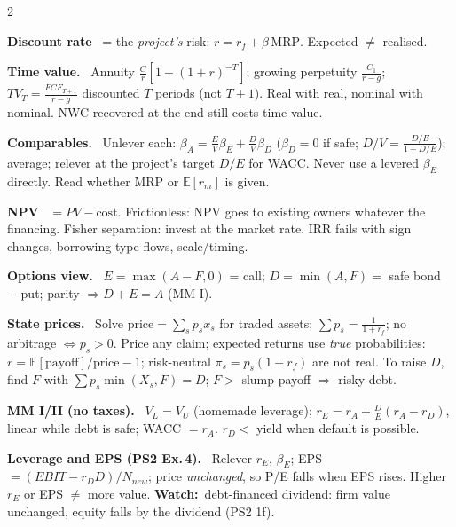 \documentclass[8pt,a4paper]{extarticle}
\newcommand{\sect}[1]{\par\needspace{4\baselineskip}\smallskip{\color{hd}\large\bfseries #1}\par\nopagebreak\vspace{1pt}}
\newcommand{\hd}[1]{\par\textbf{\color{hd}#1}~}
\newcommand{\watch}{\textbf{\color{wr}Watch:}~}
\newcommand{\E}{\mathbb{E}}
\begin{document}
\begin{multicols}{2}
\sect{2. Topic 2A --- Valuation, NPV, MM}
\hd{Discount rate} = the \emph{project's} risk: $r=r_f+\beta\,\text{MRP}$. Expected $\ne$ realised.
\hd{Time value.} Annuity $\frac Cr[1-(1+r)^{-T}]$; growing perpetuity $\frac{C_1}{r-g}$;
$TV_T=\frac{FCF_{T+1}}{r-g}$ discounted $T$ periods (not $T+1$). Real with real, nominal with nominal.
NWC recovered at the end still costs time value.
\hd{Comparables.} Unlever each: $\beta_A=\frac EV\beta_E+\frac DV\beta_D$ ($\beta_D=0$ if safe;
$D/V=\frac{D/E}{1+D/E}$); average; relever at the project's target $D/E$ for WACC. Never use a levered
$\beta_E$ directly. Read whether MRP or $\E[r_m]$ is given.
\hd{NPV} $=PV-\text{cost}$. Frictionless: NPV goes to existing owners whatever the financing. Fisher
separation: invest at the market rate. IRR fails with sign changes, borrowing-type flows, scale/timing.
\hd{Options view.} $E=\max(A-F,0)$ = call; $D=\min(A,F)=$ safe bond $-$ put; parity $\Rightarrow D+E=A$
(MM I).
\hd{State prices.} Solve $\text{price}=\sum_s p_sx_s$ for traded assets; $\sum p_s=\frac1{1+r_f}$; no
arbitrage $\Leftrightarrow p_s>0$. Price any claim; expected returns use \emph{true} probabilities:
$r=\E[\text{payoff}]/\text{price}-1$; risk-neutral $\pi_s=p_s(1+r_f)$ are not real. To raise $D$, find
$F$ with $\sum p_s\min(X_s,F)=D$; $F>$ slump payoff $\Rightarrow$ risky debt.
\hd{MM I/II (no taxes).} $V_L=V_U$ (homemade leverage); $r_E=r_A+\frac DE(r_A-r_D)$, linear while
debt is safe; WACC $=r_A$. $r_D<$ yield when default is possible.
\hd{Leverage and EPS (PS2 Ex.\,4).} Relever $r_E$, $\beta_E$; EPS$=(EBIT-r_DD)/N_{new}$; price
\emph{unchanged}, so P/E falls when EPS rises. Higher $r_E$ or EPS $\ne$ more value.
\watch debt-financed dividend: firm value unchanged, equity falls by the dividend (PS2 1f).


\end{multicols}
\end{document}
